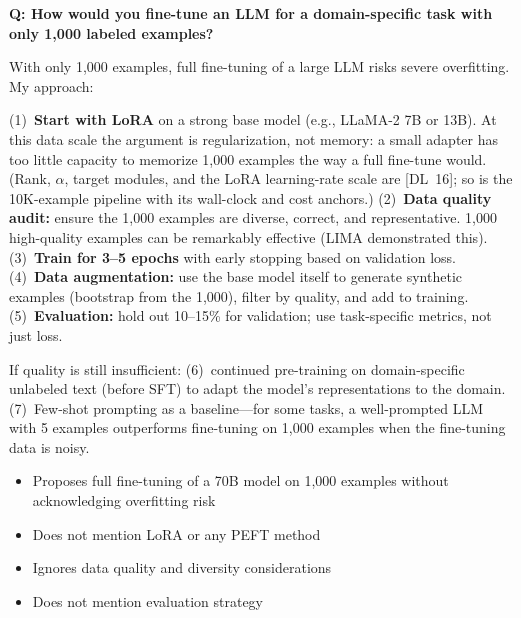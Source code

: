 \begin{interviewq}
\textbf{Q: How would you fine-tune an LLM for a domain-specific task with only
1,000 labeled examples?}

 \quad {} \quad \badgefreq{\freqhigh}

\stronganswer
With only 1,000 examples, full fine-tuning of a large LLM risks severe overfitting.
My approach:

(1)~\textbf{Start with LoRA} on a strong base model (e.g., LLaMA-2 7B or 13B).
At this data scale the argument is regularization, not memory: a small adapter
has too little capacity to memorize 1,000 examples the way a full fine-tune
would.  (Rank, $\alpha$, target modules, and the LoRA learning-rate scale are
[DL~16]; so is the 10K-example pipeline with its wall-clock and cost anchors.)
(2)~\textbf{Data quality audit:} ensure the 1,000 examples are diverse, correct,
and representative.  1,000 high-quality examples can be remarkably effective (LIMA
demonstrated this).
(3)~\textbf{Train for 3--5 epochs} with early stopping based on validation loss.
(4)~\textbf{Data augmentation:} use the base model itself to generate synthetic
examples (bootstrap from the 1,000), filter by quality, and add to training.
(5)~\textbf{Evaluation:} hold out 10--15\% for validation; use task-specific
metrics, not just loss.

If quality is still insufficient: (6)~continued pre-training on domain-specific
unlabeled text (before SFT) to adapt the model's representations to the domain.
(7)~Few-shot prompting as a baseline---for some tasks, a well-prompted LLM with
5 examples outperforms fine-tuning on 1,000 examples when the fine-tuning data
is noisy.

\redflags
\begin{itemize}
    \item Proposes full fine-tuning of a 70B model on 1,000 examples without
          acknowledging overfitting risk
    \item Does not mention LoRA or any PEFT method
    \item Ignores data quality and diversity considerations
    \item Does not mention evaluation strategy
\end{itemize}



\end{interviewq}
